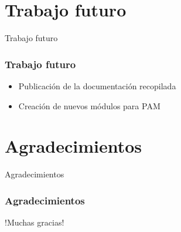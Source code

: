 \documentclass{beamer}
\begin{document}
\section{Trabajo futuro}
\begin{frame}{Trabajo futuro}
	\frametitle{Trabajo futuro}
	\begin{itemize}
		\item Publicación de la documentación recopilada
		\vspace{0.7cm}
		\item Creación de nuevos módulos para PAM
	\end{itemize}
\end{frame}
\section{Agradecimientos}
\begin{frame}{Agradecimientos}
	\frametitle{Agradecimientos}
	\begin{center}
	\huge !Muchas gracias!
	\end{center}
\end{frame}
\end{document}

